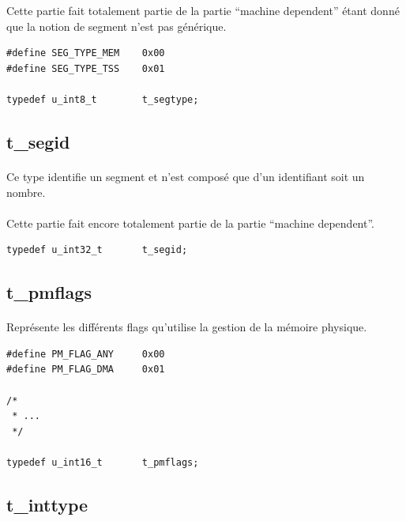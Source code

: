 \documentclass[10pt,a4wide]{article}
\begin{document}
Cette partie fait totalement partie de la partie ``machine dependent''
\'etant donn\'e que la notion de segment n'est pas g\'en\'erique.

\begin{verbatim}
#define SEG_TYPE_MEM    0x00
#define SEG_TYPE_TSS    0x01

typedef u_int8_t        t_segtype;
\end{verbatim}

\subsection{t\_segid}

\paragraph{}

Ce type identifie un segment et n'est compos\'e que d'un identifiant soit
un nombre.

\paragraph{}

Cette partie fait encore totalement partie de la partie ``machine dependent''.

\begin{verbatim}
typedef u_int32_t       t_segid;
\end{verbatim}

\subsection{t\_pmflags}

\paragraph{}

Repr\'esente les diff\'erents flags qu'utilise la gestion de la m\'emoire
physique.

\begin{verbatim}
#define PM_FLAG_ANY     0x00
#define PM_FLAG_DMA     0x01

/*
 * ...
 */

typedef u_int16_t       t_pmflags;
\end{verbatim}

\subsection{t\_inttype}
\end{document}
